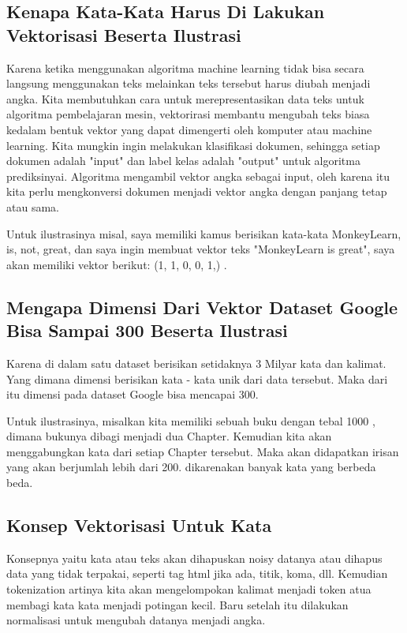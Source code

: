\subsection{Kenapa Kata-Kata Harus Di Lakukan Vektorisasi Beserta Ilustrasi}
Karena ketika menggunakan algoritma machine learning tidak bisa  secara langsung menggunakan teks melainkan teks tersebut harus diubah menjadi angka. Kita membutuhkan cara untuk merepresentasikan data teks untuk algoritma pembelajaran mesin, vektorirasi membantu mengubah teks biasa kedalam bentuk vektor yang dapat dimengerti oleh komputer atau machine learning. Kita mungkin ingin melakukan klasifikasi dokumen, sehingga setiap dokumen adalah "input" dan label kelas adalah "output" untuk algoritma prediksinyai. Algoritma mengambil vektor angka sebagai input, oleh karena itu kita perlu mengkonversi dokumen menjadi vektor angka dengan panjang tetap atau sama.
\par Untuk ilustrasinya misal,  saya memiliki kamus berisikan kata-kata {MonkeyLearn, is, not, great}, dan saya ingin membuat vektor teks "MonkeyLearn is great", saya akan memiliki vektor berikut: (1, 1, 0, 0, 1,) .

\subsection{Mengapa Dimensi Dari Vektor Dataset Google Bisa Sampai 300 Beserta Ilustrasi}
Karena di dalam satu dataset berisikan setidaknya 3 Milyar kata dan kalimat. Yang dimana dimensi berisikan kata - kata unik dari data tersebut. Maka dari itu dimensi pada dataset Google bisa mencapai 300.

Untuk ilustrasinya, misalkan kita memiliki sebuah buku dengan tebal 1000 , dimana bukunya dibagi menjadi dua Chapter. Kemudian kita akan menggabungkan kata dari setiap Chapter tersebut. Maka akan didapatkan irisan yang akan berjumlah lebih dari 200. dikarenakan banyak kata yang berbeda beda.

\subsection{Konsep Vektorisasi Untuk Kata}
Konsepnya yaitu kata atau teks akan dihapuskan noisy datanya atau dihapus data yang tidak terpakai, seperti tag html jika ada, titik, koma, dll. Kemudian tokenization artinya kita akan mengelompokan kalimat menjadi token atua membagi kata kata menjadi potingan kecil. Baru setelah itu dilakukan normalisasi untuk mengubah datanya menjadi angka.

